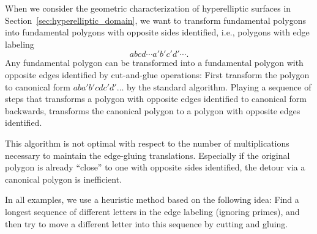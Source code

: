 \documentclass[Thesis]{subfiles}
\begin{document}
% 


When we consider the geometric characterization of hyperelliptic
surfaces in Section~\ref{sec:hyperelliptic_domain}, we want to
transform fundamental polygons into fundamental polygons with opposite
sides identified, i.e., polygons with edge labeling 
\begin{equation*}
abcd\cdots a'b'c'd'\cdots.
\end{equation*}
Any fundamental polygon can be transformed into a fundamental polygon
with opposite edges identified by cut-and-glue operations: First
transform the polygon to canonical form $aba'b'cdc'd'\ldots$ by the
standard algorithm. Playing a sequence of steps that transforms
a polygon with opposite edges identified to canonical form backwards,
transforms the canonical polygon to a polygon with opposite edges
identified.

This algorithm is not optimal with respect to the number of
multiplications necessary to maintain the edge-gluing
translations. Especially if the original polygon is already ``close''
to one with opposite sides identified, the detour via a canonical
polygon is inefficient.  

In all examples, we use a heuristic method based on the following
idea: Find a longest sequence of different letters in the edge
labeling (ignoring primes), and then try to move a different letter
into this sequence by cutting and gluing.
\end{document}
